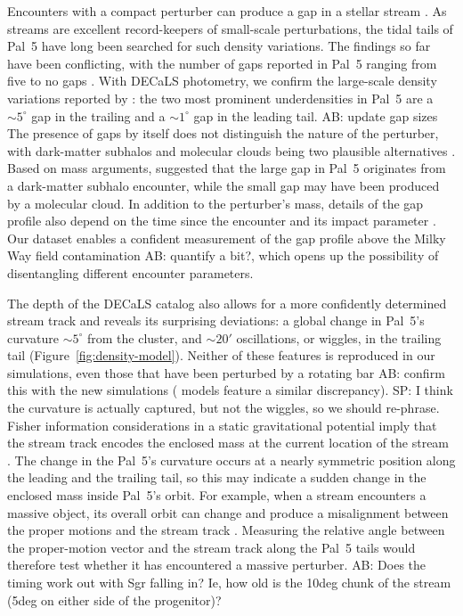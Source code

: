 \documentclass[twocolumn]{aastex62}
\newcommand{\ab}[1]{{\color{teal} AB: #1}}
\newcommand{\sa}[1]{{\color{magenta} SP: #1}}
\begin{document}
Encounters with a compact perturber can produce a gap in a stellar stream \citep[e.g.,][]{Johnston:2002,Ibata:2002}. As streams are excellent record-keepers of small-scale perturbations, the tidal tails of Pal~5 have long been searched for such density variations.
The findings so far have been conflicting, with the number of gaps reported in Pal~5 ranging from five \citep{Carlberg:2012} to no gaps \citep{Ibata:2016}.
With DECaLS photometry, we confirm the large-scale density variations reported by \citet{Erkal:2017}: the two most prominent underdensities in Pal~5 are a $\sim5^\circ$ gap in the trailing and a $\sim1^\circ$ gap in the leading tail. 
\ab{update gap sizes}
The presence of gaps by itself does not distinguish the nature of the perturber, with dark-matter subhalos and molecular clouds being two plausible alternatives \citep[e.g.,][]{Yoon:2011,Amorisco:2016}.
Based on mass arguments, \citet{Erkal:2017} suggested that the large gap in Pal~5 originates from a dark-matter subhalo encounter, while the small gap may have been produced by a molecular cloud.
In addition to the perturber's mass, details of the gap profile also depend on the time since the encounter and its impact parameter \citep{Erkal:2015}.
Our dataset enables a confident measurement of the gap profile above the Milky Way field contamination \ab{quantify a bit?}, which opens up the possibility of disentangling different encounter parameters.

The depth of the DECaLS catalog also allows for a more confidently determined stream track and reveals its surprising deviations: a global change in Pal~5's curvature $\sim5^\circ$ from the cluster, and $\sim20'$ oscillations, or wiggles, in the trailing tail (Figure~\ref{fig:density-model}).
Neither of these features is reproduced in our simulations, even those that have been perturbed by a rotating bar \ab{confirm this with the new simulations} (\citealt{Erkal:2017} models feature a similar discrepancy). \sa{I think the curvature is actually captured, but not the wiggles, so we should re-phrase.}
Fisher information considerations in a static gravitational potential imply that the stream track encodes the enclosed mass at the current location of the stream \citep{Bonaca:2018}.
The change in the Pal~5's curvature occurs at a nearly symmetric position along the leading and the trailing tail, so this may indicate a sudden change in the enclosed mass inside Pal~5's orbit.
For example, when a stream encounters a massive object, its overall orbit can change and produce a misalignment between the proper motions and the stream track \citep{Erkal:2018, Koposov:2019}.
Measuring the relative angle between the proper-motion vector and the stream track along the Pal~5 tails would therefore test whether it has encountered a massive perturber.
\ab{Does the timing work out with Sgr falling in? Ie, how old is the 10deg chunk of the stream (5deg on either side of the progenitor)?}
\end{document}
